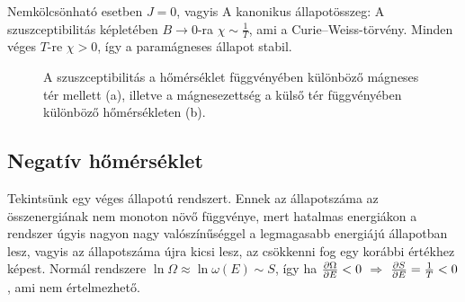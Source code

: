    Nemkölcsönható esetben $J=0$, vagyis
   A kanonikus állapotösszeg:
   A szuszceptibilitás képletében $B\to 0$-ra $\chi\sim\frac{1}{T}$, ami a Curie--Weiss-törvény. Minden véges $T$-re $\chi>0$, így a paramágneses állapot stabil. 
   
   \begin{figure}[ht!]
    \centering
     \hspace{6pt}
    \caption{A szuszceptibilitás a hőmérséklet függvényében különböző mágneses tér mellett (a), illetve a mágnesezettség a külső tér függvényében különböző hőmérsékleten (b).}
   \end{figure}
   
  \subsection{Negatív hőmérséklet}\label{ss:neghom}
   
   Tekintsünk egy véges állapotú rendszert. Ennek az állapotszáma az összenergiának nem monoton növő függvénye, mert hatalmas energiákon a rendszer úgyis nagyon nagy valószínűséggel a legmagasabb energiájú állapotban lesz, vagyis az állapotszáma újra kicsi lesz, az csökkenni fog egy korábbi értékhez képest. Normál rendszere $\ln\Omega\approx\ln\omega(E)\sim S$, így ha $\frac{\partial \Omega}{\partial E}<0$ $\Rightarrow$ $\frac{\partial S}{\partial E}=\frac{1}{T}<0$, ami nem értelmezhető.
   
